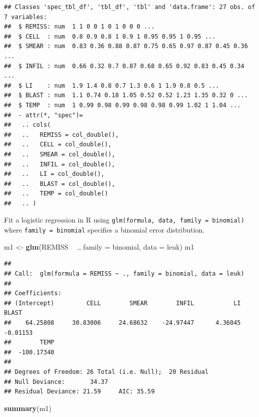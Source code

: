 \documentclass[
]{book}
\newenvironment{Shaded}{\begin{snugshade}}{\end{snugshade}}
\newcommand{\DataTypeTok}[1]{\textcolor[rgb]{0.13,0.29,0.53}{#1}}
\newcommand{\KeywordTok}[1]{\textcolor[rgb]{0.13,0.29,0.53}{\textbf{#1}}}
\newcommand{\NormalTok}[1]{#1}
\newcommand{\OperatorTok}[1]{\textcolor[rgb]{0.81,0.36,0.00}{\textbf{#1}}}
\newcommand{\StringTok}[1]{\textcolor[rgb]{0.31,0.60,0.02}{#1}}
\begin{document}
\begin{verbatim}
## Classes 'spec_tbl_df', 'tbl_df', 'tbl' and 'data.frame': 27 obs. of  7 variables:
##  $ REMISS: num  1 1 0 0 1 0 1 0 0 0 ...
##  $ CELL  : num  0.8 0.9 0.8 1 0.9 1 0.95 0.95 1 0.95 ...
##  $ SMEAR : num  0.83 0.36 0.88 0.87 0.75 0.65 0.97 0.87 0.45 0.36 ...
##  $ INFIL : num  0.66 0.32 0.7 0.87 0.68 0.65 0.92 0.83 0.45 0.34 ...
##  $ LI    : num  1.9 1.4 0.8 0.7 1.3 0.6 1 1.9 0.8 0.5 ...
##  $ BLAST : num  1.1 0.74 0.18 1.05 0.52 0.52 1.23 1.35 0.32 0 ...
##  $ TEMP  : num  1 0.99 0.98 0.99 0.98 0.98 0.99 1.02 1 1.04 ...
##  - attr(*, "spec")=
##   .. cols(
##   ..   REMISS = col_double(),
##   ..   CELL = col_double(),
##   ..   SMEAR = col_double(),
##   ..   INFIL = col_double(),
##   ..   LI = col_double(),
##   ..   BLAST = col_double(),
##   ..   TEMP = col_double()
##   .. )
\end{verbatim}

Fit a logistic regression in R using \texttt{glm(formula,\ data,\ family\ =\ binomial)} where \texttt{family\ =\ binomial} specifies a binomial error distribution.

\begin{Shaded}
\begin{Highlighting}[]
\NormalTok{m1 <-}\StringTok{ }\KeywordTok{glm}\NormalTok{(REMISS }\OperatorTok{~}\StringTok{ }\NormalTok{., }\DataTypeTok{family =}\NormalTok{ binomial, }\DataTypeTok{data =}\NormalTok{ leuk)}
\NormalTok{m1}
\end{Highlighting}
\end{Shaded}

\begin{verbatim}
## 
## Call:  glm(formula = REMISS ~ ., family = binomial, data = leuk)
## 
## Coefficients:
## (Intercept)         CELL        SMEAR        INFIL           LI        BLAST  
##    64.25808     30.83006     24.68632    -24.97447      4.36045     -0.01153  
##        TEMP  
##  -100.17340  
## 
## Degrees of Freedom: 26 Total (i.e. Null);  20 Residual
## Null Deviance:       34.37 
## Residual Deviance: 21.59     AIC: 35.59
\end{verbatim}

\begin{Shaded}
\begin{Highlighting}[]
\KeywordTok{summary}\NormalTok{(m1)}
\end{Highlighting}
\end{Shaded}
\end{document}
